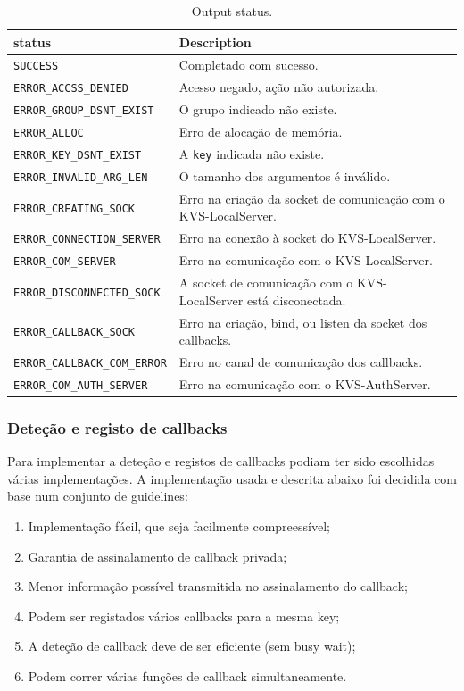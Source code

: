 \begin{table}[ht!]
    \centering
     \caption{Output status.}
    \begin{tabular}{ll}
        \hline
         status & Description\\  
         \hline
         \texttt{SUCCESS} & Completado com sucesso.\\
         \texttt{ERROR\_ACCSS\_DENIED} & Acesso negado, ação não autorizada. \\
         \texttt{ERROR\_GROUP\_DSNT\_EXIST} & O grupo indicado não existe. \\
         \texttt{ERROR\_ALLOC} & Erro de alocação de memória. \\
         \texttt{ERROR\_KEY\_DSNT\_EXIST} & A \texttt{key} indicada não existe. \\
         \texttt{ERROR\_INVALID\_ARG\_LEN} & O tamanho dos argumentos é inválido. \\
         \texttt{ERROR\_CREATING\_SOCK} & Erro na criação da socket de comunicação com o KVS-LocalServer. \\
         \texttt{ERROR\_CONNECTION\_SERVER} & Erro na conexão à socket do KVS-LocalServer.  \\
         \texttt{ERROR\_COM\_SERVER} & Erro na comunicação com o KVS-LocalServer. \\
         \texttt{ERROR\_DISCONNECTED\_SOCK} & A socket de comunicação com o KVS-LocalServer está disconectada. \\
         \texttt{ERROR\_CALLBACK\_SOCK} & Erro na criação, bind, ou listen da socket dos callbacks.\\
         \texttt{ERROR\_CALLBACK\_COM\_ERROR} & Erro no canal de comunicação dos callbacks.\\
         \texttt{ERROR\_COM\_AUTH\_SERVER} & Erro na comunicação com o KVS-AuthServer.\\
         \hline
    \end{tabular}
   
    \label{tab:status_val}
\end{table}

\subsubsection{Deteção e registo de callbacks}\label{sec:callback_API}
Para implementar a deteção e registos de callbacks podiam ter sido escolhidas várias implementações. A implementação usada e descrita abaixo foi decidida com base num conjunto de guidelines:
\begin{enumerate}[noitemsep]
\item Implementação fácil, que seja facilmente compreessível;
\item Garantia de assinalamento de callback privada;
\item Menor informação possível transmitida no assinalamento do callback;
\item Podem ser registados vários callbacks para a mesma key;
\item A deteção de callback deve de ser eficiente (sem busy wait);
\item Podem correr várias funções de callback simultaneamente.
\end{enumerate}


